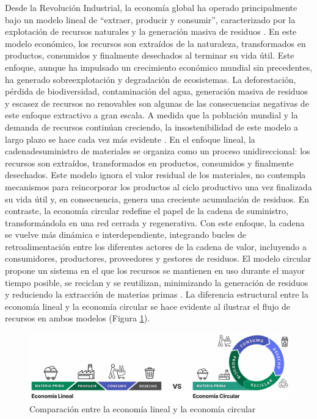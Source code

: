 Desde la Revolución Industrial, la economía global ha operado principalmente bajo un modelo lineal de ``extraer, producir y consumir'', caracterizado por la explotación de recursos naturales y la generación masiva de residuos \cite{cerda2016economia}. En este modelo económico, los recursos son extraídos de la naturaleza, transformados en productos, consumidos y finalmente desechados al terminar su vida útil. Este enfoque, aunque ha impulsado un crecimiento económico mundial sin precedentes, ha generado sobreexplotación y degradación de ecosistemas. La deforestación, pérdida de biodiversidad, contaminación del agua, generación masiva de residuos y escasez de recursos no renovables son algunas de las consecuencias negativas de este enfoque extractivo a gran escala. A medida que la población mundial y la demanda de recursos continúan creciendo, la insostenibilidad de este modelo a largo plazo se hace cada vez más evidente \cite{clima2022book}. En el enfoque lineal, la \gls{cadenadesuministro} de materiales se organiza como un proceso unidireccional: los recursos son extraídos, transformados en productos, consumidos y finalmente desechados. Este modelo ignora el valor residual de los materiales, no contempla mecanismos para reincorporar los productos al ciclo productivo una vez finalizada su vida útil y, en consecuencia, genera una creciente acumulación de residuos. En contraste, la economía circular redefine el papel de la cadena de suministro, transformándola en una red cerrada y regenerativa. Con este enfoque, la cadena se vuelve más dinámica e interdependiente, integrando bucles de retroalimentación entre los diferentes actores de la cadena de valor, incluyendo a consumidores, productores, proveedores y gestores de residuos. El modelo circular propone un sistema en el que los recursos se mantienen en uso durante el mayor tiempo posible, se reciclan y se reutilizan, minimizando la generación de residuos y reduciendo la extracción de materias primas \cite{ellenmacarthurfoundation2022}. La diferencia estructural entre la economía lineal y la economía circular se hace evidente al ilustrar el flujo de recursos en ambos modelos (Figura \ref{fig:circular-linear-economy-comparison}).

\begin{figure}[!tb]
    \centering
    \includegraphics[width=\textwidth]{Figures/circular-linear-economy-comparison.png}
    \caption{Comparación entre la economía lineal y la economía circular}
    \label{fig:circular-linear-economy-comparison}
\end{figure}

